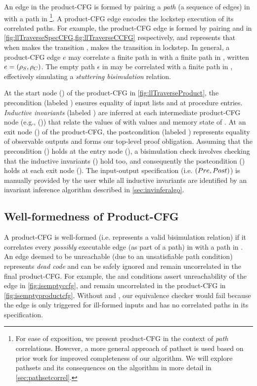 An edge in the product-CFG is formed by pairing a {\em path} (a sequence of edges) in \sprog{}
with a path in \cprog{}\footnote{
For ease of exposition, we present product-CFG in the context of {\em path} correlations.
However, a more general approach of pathset is used based on prior work \cite{oopsla20}
for improved completeness of our algorithm.
We will explore pathsets and its consequences on the algorithm in more detail in \cref{sec:pathsetcorrel}.}.
A product-CFG edge encodes the lockstep execution of its correlated paths.
For example, the product-CFG edge  is formed by pairing
 and  in \cref{fig:llTraverseSpecCFG,fig:llTraverseCCFG} respectively,
and represents that when \sprog{} makes the transition , \cprog{} makes the transition 
in lockstep.
In general, a product-CFG edge $e$ may correlate a finite path \sv{\rho} in \sprog{} with a finite path
\cv{\rho} in \cprog{}, written $e=({\tt \rho}_{S},{\tt \rho}_{C})$.
The empty path $\epsilon$ in \sprog{} may be correlated with a finite path in \cprog{},
effectively simulating a {\em stuttering bisimulation} relation.

At the start node () of the product-CFG in \cref{fig:llTraverseProduct},
the precondition \pre{} (labeled )
ensures equality of input lists  and  at procedure entries.
{\em Inductive invariants} (labeled ) are inferred
at each intermediate product-CFG node (e.g., ()) that relate
the values of \sprog{} with values and memory state of \cprog{}.
At an exit node () of the product-CFG, the postcondition \post{} (labeled )
represents equality of observable outputs and forms our top-level proof obligation.
Assuming that the precondition \pre{} () holds at the entry node (),
a bisimulation check involves checking that the inductive invariants () hold too,
and consequently the postcondition \post{} () holds at each exit node ().
The input-output specification (i.e. $({Pre}{},{Post}{})$) is manually provided by the user
while all inductive invariants are identified by an invariant inference algorithm described in \cref{sec:invinferalgo}.

\subsection{Well-formedness of Product-CFG}
A product-CFG is well-formed (i.e. represents a valid bisimulation relation) if it correlates every {\em possibly} executable
edge (as part of a path) in \cprog{} with a path in \sprog{}.
An edge deemed to be unreachable (due to an unsatisfiable path condition) represents {\em dead code} and can be
safely ignored and remain uncorrelated in the final product-CFG.
For example, the \sdef{} and \pre{} conditions assert unreachability of the edge  in \cref{fig:isemptyccfg},
and remain uncorrelated in the product-CFG in \cref{fig:isemptyproductcfg}.
Without \sdef{} and \pre{}, our equivalence checker would fail because the edge  is only triggered for ill-formed
inputs and has no correlated paths in its specification.

